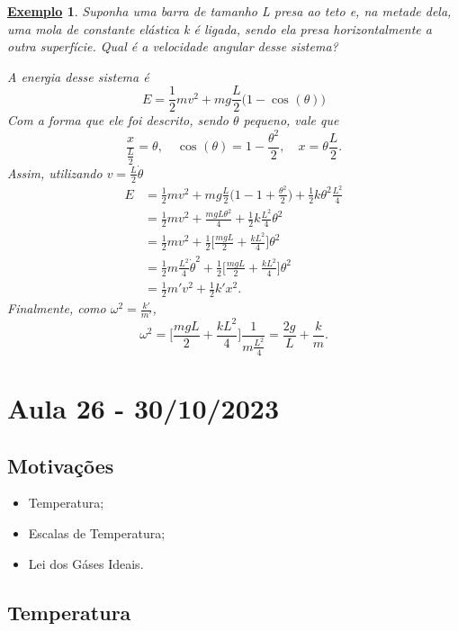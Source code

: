 \documentclass{article}
\newtheorem{example}{\underline{Exemplo}}
\begin{document}
\begin{example}
  Suponha uma barra de tamanho L presa ao teto e, na metade dela, uma mola de constante elástica k é ligada, sendo ela presa horizontalmente a outra superfície.
  Qual é a velocidade angular desse sistema?

  A energia desse sistema é 
  \[
    E = \frac{1}{2}mv^{2} + mg \frac{L}{2}\biggl(1-\cos^{}{(\theta )}\biggr)
  \]
  Com a forma que ele foi descrito, sendo \(\theta \) pequeno, vale que 
  \[
    \frac{x}{\frac{L}{2}} = \theta,\quad \cos^{}{(\theta )} = 1 -\frac{\theta^{2}}{2},\quad x = \theta \frac{L}{2}. 
  \]
  Assim, utilizando \(v = \frac{L}{2}\dot\theta \) 
  \begin{align*}
    E &= \frac{1}{2}mv^{2} + mg \frac{L}{2}\biggl(1 - 1 + \frac{\theta ^{2}}{2}\biggr) + \frac{1}{2}k\theta^{2}\frac{L^{2}}{4} \\
      &= \frac{1}{2}mv^{2} + \frac{mgL\theta ^{2}}{4} + \frac{1}{2}k \frac{L^{2}}{4}\theta^{2}\\
      &= \frac{1}{2}mv^{2} + \frac{1}{2}\biggl[\frac{mgL}{2} + \frac{kL^{2}}{4}\biggr]\theta^{2}\\
      &= \frac{1}{2}m \frac{L^{2}}{4}\dot \theta ^{2} + \frac{1}{2}\biggl[\frac{mgL}{2}+ \frac{kL^{2}}{4}\biggr]\theta^{2}\\
      &= \frac{1}{2}m'v^{2} + \frac{1}{2}k'x^{2}.
  \end{align*}
  Finalmente, como \(\omega^{2} = \frac{k'}{m'}\), 
  \[
    \omega^{2} = \biggl[\frac{mgL}{2}+ \frac{kL^{2}}{4}\biggr]\frac{1}{m \frac{L^{2}}{4}} = \frac{2g}{L} + \frac{k}{m}.
  \]
\end{example}
\newpage

\section{Aula 26 - 30/10/2023}
\subsection{Motivações} 
\begin{itemize}
  \item Temperatura;
  \item Escalas de Temperatura;
  \item Lei dos Gáses Ideais.
\end{itemize}
\subsection{Temperatura}
\end{document}
